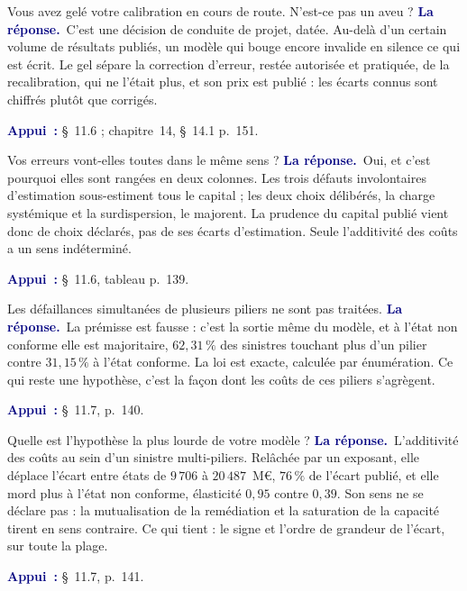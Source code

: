 \documentclass[11pt,a4paper]{article}
\newcommand{\rep}[1]{\smallskip\noindent\textcolor{navy}{\textbf{La réponse.}}\ #1\par}
\newcommand{\appui}[1]{\smallskip\noindent\small\textcolor{navy}{\textbf{Appui~:}} #1\par\normalsize}
\begin{document}
\begin{question}{\og Vous avez gelé votre calibration en cours de route. N'est-ce pas un aveu ?\fg{}}
\rep{C'est une décision de conduite de projet, datée. Au-delà d'un certain volume de résultats
publiés, un modèle qui bouge encore invalide en silence ce qui est écrit. Le gel sépare la
correction d'erreur, restée autorisée et pratiquée, de la recalibration, qui ne l'était plus, et
son prix est publié : les écarts connus sont chiffrés plutôt que corrigés.}
\appui{\S~11.6 ; chapitre~14, \S~14.1 p.~151.}
\end{question}

\begin{question}{\og Vos erreurs vont-elles toutes dans le même sens ?\fg{}}
\rep{Oui, et c'est pourquoi elles sont rangées en deux colonnes. Les trois défauts involontaires
d'estimation sous-estiment tous le capital ; les deux choix délibérés, la charge systémique et la
surdispersion, le majorent. La prudence du capital publié vient donc de choix déclarés, pas de ses
écarts d'estimation. Seule l'additivité des coûts a un sens indéterminé.}
\appui{\S~11.6, tableau p.~139.}
\end{question}

\begin{question}{\og Les défaillances simultanées de plusieurs piliers ne sont pas traitées.\fg{}}
\rep{La prémisse est fausse : c'est la sortie même du modèle, et à l'état non conforme elle est
majoritaire, $62{,}31\,\%$ des sinistres touchant plus d'un pilier contre $31{,}15\,\%$ à l'état
conforme. La loi est exacte, calculée par énumération. Ce qui reste une hypothèse, c'est la façon
dont les coûts de ces piliers s'agrègent.}
\appui{\S~11.7, p.~140.}
\end{question}

\begin{question}{\og Quelle est l'hypothèse la plus lourde de votre modèle ?\fg{}}
\rep{L'additivité des coûts au sein d'un sinistre multi-piliers. Relâchée par un exposant, elle
déplace l'écart entre états de $9\,706$ à $20\,487$~M\euro, $76\,\%$ de l'écart publié, et elle
mord plus à l'état non conforme, élasticité $0{,}95$ contre $0{,}39$. Son sens ne se déclare pas :
la mutualisation de la remédiation et la saturation de la capacité tirent en sens contraire. Ce qui
tient : le signe et l'ordre de grandeur de l'écart, sur toute la plage.}
\appui{\S~11.7, p.~141.}
\end{question}

\end{document}
